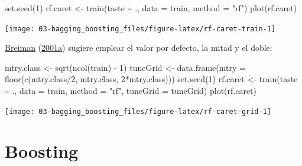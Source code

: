 \documentclass[
  spanish,
]{book}
\newenvironment{Shaded}{\begin{snugshade}}{\end{snugshade}}
\newcommand{\AttributeTok}[1]{\textcolor[rgb]{0.77,0.63,0.00}{#1}}
\newcommand{\DecValTok}[1]{\textcolor[rgb]{0.00,0.00,0.81}{#1}}
\newcommand{\FunctionTok}[1]{\textcolor[rgb]{0.00,0.00,0.00}{#1}}
\newcommand{\NormalTok}[1]{#1}
\newcommand{\OtherTok}[1]{\textcolor[rgb]{0.56,0.35,0.01}{#1}}
\newcommand{\SpecialCharTok}[1]{\textcolor[rgb]{0.00,0.00,0.00}{#1}}
\newcommand{\StringTok}[1]{\textcolor[rgb]{0.31,0.60,0.02}{#1}}
\theoremstyle{break}
\theoremstyle{definition}
\theoremstyle{definition}
\theoremstyle{definition}
\theoremstyle{definition}
\theoremstyle{remark}
\begin{document}
\begin{Shaded}
\begin{Highlighting}[]
\FunctionTok{set.seed}\NormalTok{(}\DecValTok{1}\NormalTok{)}
\NormalTok{rf.caret }\OtherTok{\textless{}{-}} \FunctionTok{train}\NormalTok{(taste }\SpecialCharTok{\textasciitilde{}}\NormalTok{ ., }\AttributeTok{data =}\NormalTok{ train, }\AttributeTok{method =} \StringTok{"rf"}\NormalTok{)}
\FunctionTok{plot}\NormalTok{(rf.caret)}
\end{Highlighting}
\end{Shaded}

\begin{center}\texttt{[image: 03-bagging\_boosting\_files/figure-latex/rf-caret-train-1]} \end{center}

\protect\hyperlink{ref-breiman2001random}{Breiman} (\protect\hyperlink{ref-breiman2001random}{2001a}) sugiere emplear el valor por defecto, la mitad y el doble:

\begin{Shaded}
\begin{Highlighting}[]
\NormalTok{mtry.class }\OtherTok{\textless{}{-}} \FunctionTok{sqrt}\NormalTok{(}\FunctionTok{ncol}\NormalTok{(train) }\SpecialCharTok{{-}} \DecValTok{1}\NormalTok{)}
\NormalTok{tuneGrid }\OtherTok{\textless{}{-}} \FunctionTok{data.frame}\NormalTok{(}\AttributeTok{mtry =} \FunctionTok{floor}\NormalTok{(}\FunctionTok{c}\NormalTok{(mtry.class}\SpecialCharTok{/}\DecValTok{2}\NormalTok{, mtry.class, }\DecValTok{2}\SpecialCharTok{*}\NormalTok{mtry.class)))}
\FunctionTok{set.seed}\NormalTok{(}\DecValTok{1}\NormalTok{)}
\NormalTok{rf.caret }\OtherTok{\textless{}{-}} \FunctionTok{train}\NormalTok{(taste }\SpecialCharTok{\textasciitilde{}}\NormalTok{ ., }\AttributeTok{data =}\NormalTok{ train,}
                  \AttributeTok{method =} \StringTok{"rf"}\NormalTok{, }\AttributeTok{tuneGrid =}\NormalTok{ tuneGrid)}
\FunctionTok{plot}\NormalTok{(rf.caret)}
\end{Highlighting}
\end{Shaded}

\begin{center}\texttt{[image: 03-bagging\_boosting\_files/figure-latex/rf-caret-grid-1]} \end{center}

\hypertarget{boosting}{%
\section{Boosting}\label{boosting}}
\end{document}
